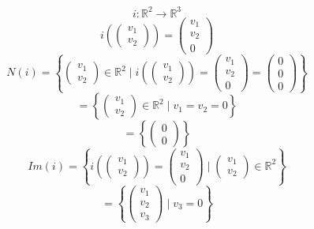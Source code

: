 \documentclass[a4paper]{article}
\theoremstyle{break}
\theoremstyle{break}
\theoremstyle{break}
\theoremstyle{break}
\begin{document}
\begin{example}
 \[
 i: \mathbb{R}^2 \to \mathbb{R}^3
 \]  
 \[
 i \left( \begin{pmatrix} 
     v_1\\
     v_2
 \end{pmatrix}  \right) = \begin{pmatrix} 
     v_1\\
     v_2\\
     0
  \end{pmatrix}
 \] 
 \[
 N(i) = \left\{ \begin{pmatrix} 
     v_1\\
     v_2
 \end{pmatrix} \in \mathbb{R}^2 \;\Big |\; i \left( \begin{pmatrix} 
   v_1\\
   v_2
\end{pmatrix}  \right) = 
\begin{pmatrix} 
  v_1\\
  v_2\\
  0
\end{pmatrix} 
=
\begin{pmatrix} 
  0\\
  0\\
  0
\end{pmatrix} 
\right\} 
 \] 
 \[
 = \left\{ \begin{pmatrix} 
     v_1\\
     v_2
 \end{pmatrix} \in \mathbb{R}^2 
 \; \Big | \; v_1 = v_2 = 0
\right\} 
 \] 
 \[
 = \left\{ \begin{pmatrix} 
     0\\
     0
 \end{pmatrix}  \right\} 
 \] 
 \vspace{1em}
 \[
 Im(i) = \left\{ i \left( \begin{pmatrix} 
      v_1\\
      v_2
 \end{pmatrix}  \right) =
 \begin{pmatrix} 
   v_1\\
   v_2\\
   0
 \end{pmatrix} 
 \; \Big | \; \begin{pmatrix} 
   v_1\\
   v_2
  \end{pmatrix} \in \mathbb{R}^2 \right\}
 \] 
 \[
 = \left\{ \begin{pmatrix} 
     v_1\\
     v_2\\
     v_3
 \end{pmatrix} 
 \; \Big | \; v_3 = 0
\right\} 
 \] 
\end{example}
\end{document}

